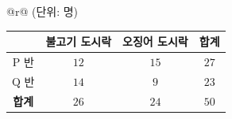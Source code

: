 {\setlength{\tabcolsep}{5pt}\renewcommand{\arraystretch}{1.3}%
\begin{tabular}{@{}r@{}}
{\footnotesize (단위: 명)}\\[0.6mm]
\begin{tabular}{|c|c|c|c|}
\hline
\makebox[11mm]{} & \textbf{불고기 도시락} & \textbf{오징어 도시락} & \textbf{합계} \\
\hline
$\mathrm{P}$ 반 & $12$ & $15$ & $27$ \\
\hline
$\mathrm{Q}$ 반 & $14$ & $9$ & $23$ \\
\hline
\textbf{합계} & $26$ & $24$ & $50$ \\
\hline
\end{tabular}
\end{tabular}}
